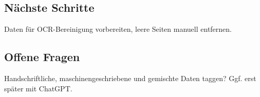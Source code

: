 \documentclass{article}
\begin{document}
\subsection*{Nächste Schritte}
 Daten für OCR-Bereinigung vorbereiten, leere Seiten manuell entfernen.
\subsection*{Offene Fragen}
 Handschriftliche, maschinengeschriebene und gemischte Daten taggen? Ggf. erst später mit ChatGPT.

\noindent\hrulefill

\end{document}
